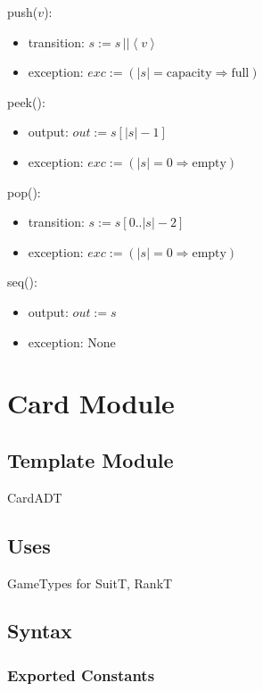 \documentclass[12pt]{article}
\newcommand{\Implies}{\Rightarrow}
\begin{document}
\noindent push($v$):
\begin{itemize}
    \item transition: $s := s \,|| \left< v \right>$
    \item exception: $exc := (|s| = \mbox{capacity} \Implies \mbox{full})$
\end{itemize}

\noindent peek():
\begin{itemize}
    \item output: $out := s[|s| - 1]$
    \item exception: $exc := (|s| = 0 \Implies \mbox{empty})$
\end{itemize}

\noindent pop():
\begin{itemize}
    \item transition: $s := s[0..|s| - 2]$
    \item exception: $exc := (|s| = 0 \Implies \mbox{empty})$
\end{itemize}

\noindent seq():
\begin{itemize}
    \item output: $out := s$
    \item exception: None
\end{itemize}

\newpage


\section*{Card Module}

\subsection*{Template Module}

CardADT

\subsection*{Uses}

GameTypes for SuitT, RankT

\subsection*{Syntax}

\subsubsection*{Exported Constants}
\end{document}
